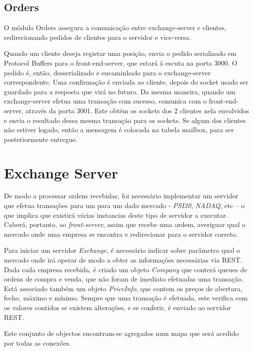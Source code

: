 \documentclass[a4paper,12pt]{article}
\begin{document}
\subsection{Orders}
O módulo Orders assegura a comunicação entre exchange-server e clientes, redirecionando pedidos de clientes para o servidor e vice-versa. 
\par Quando um cliente deseja registar uma posição, envia o pedido serializado em Protocol Buffers para o front-end-server, que estará à escuta na porta 3000. O pedido é, então, desserializado e encaminhado para o exchange-server correspondente. Uma confirmação é enviada ao cliente, depois do socket usado ser guardado para a resposta que virá no futuro. Da mesma maneira, quando um exchange-server efetua uma transação com sucesso, comunica com o front-end-server, através da porta 3001. Este obtém os sockets dos 2 clientes nela envolvidos e envia o resultado dessa mesma transação para os sockets. Se algum dos clientes não estiver logado, então a mensagem é colocada na tabela mailbox, para ser posteriormente entregue.

\section{Exchange Server}

\par De modo a processar ordens recebidas, foi necessário implementar um servidor que efetua transações para um para um dado mercado - \textit{PSI20}, \textit{NADAQ}, etc – o que implica que existirá várias instancias deste tipo de servidor a executar. Caberá, portanto, ao \textit{front-server}, assim que recebe uma ordem, averiguar qual o mercado onde uma empresa se encontra e redirecionar para o servidor correto. 

\par Para iniciar um servidor \textit{Exchange}, é necessário indicar sobre parâmetro qual o mercado onde irá operar de modo a obter as informações necessárias via REST. Dada cada empresa recebida, é criado um objeto \textit{Company} que conterá queues de ordens de compra e venda, que não foram de imediato efetuadas uma transação. Está associado também um objeto \textit{PriceInfo}, que contem os preços de abertura, fecho, máximo e mínimo. Sempre que uma transação é efetuada, este verifica com os valores contidos se existem alterações, e se conferir, é enviado ao servidor REST.

\par Este conjunto de objectos encontram-se agregados num mapa que será acedido por todas as conexões. 
\end{document}
